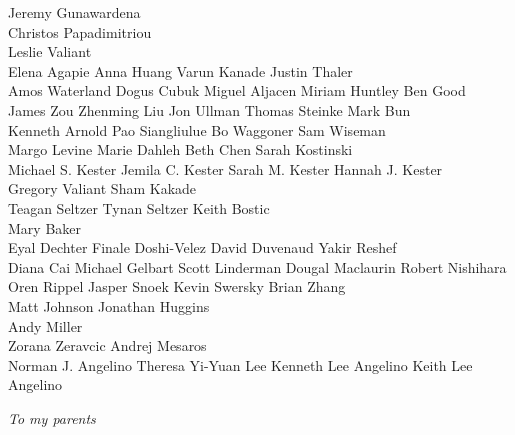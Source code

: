 \begin{spacing}{2}
\begin{center}
Jeremy Gunawardena \\
Christos Papadimitriou \\
Leslie Valiant \\
Elena Agapie \quad Anna Huang \quad Varun Kanade \quad Justin Thaler \\
Amos Waterland \quad Dogus Cubuk \quad Miguel Aljacen \quad Miriam Huntley \quad Ben Good \\
James Zou \quad Zhenming Liu \quad Jon Ullman \quad Thomas Steinke \quad Mark Bun \\ 
Kenneth Arnold \quad Pao Siangliulue \quad Bo Waggoner \quad Sam Wiseman \\
Margo Levine \quad Marie Dahleh \quad Beth Chen \quad Sarah Kostinski \\
Michael S. Kester \quad Jemila C. Kester \quad Sarah M. Kester \quad Hannah J. Kester \\
Gregory Valiant \quad Sham Kakade \\
Teagan Seltzer \quad Tynan Seltzer \quad Keith Bostic \\
Mary Baker \\
Eyal Dechter \quad Finale Doshi-Velez \quad David Duvenaud \quad Yakir Reshef \\
Diana Cai \quad Michael Gelbart \quad Scott Linderman \quad Dougal Maclaurin \quad Robert Nishihara \\
Oren Rippel \quad Jasper Snoek \quad Kevin Swersky \quad Brian Zhang \\ 
Matt Johnson \quad Jonathan Huggins \\ 
Andy Miller  \\
Zorana Zeravcic \quad Andrej Mesaros \\
Norman J. Angelino \quad Theresa Yi-Yuan Lee \quad Kenneth Lee Angelino \quad Keith Lee Angelino
\end{center}


\end{spacing}


\newpage
\begin{center}
\end{center}
\begin{center}
\end{center}
\hfill \emph{To my parents}
